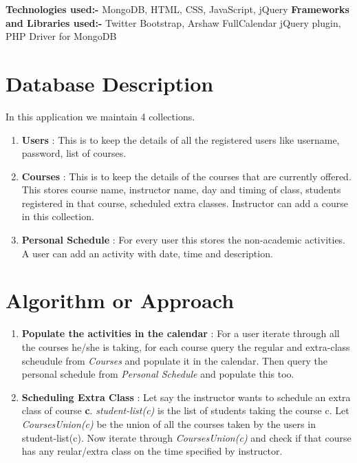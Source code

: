 \documentclass[twocolumn]{article}
\newcommand{\comment}[1]{}
\begin{document}
\textbf{Technologies used:-} MongoDB, HTML, CSS, JavaScript, jQuery
\newline
\textbf{Frameworks and Libraries used:-} Twitter Bootstrap, Arshaw FullCalendar jQuery plugin, PHP Driver for MongoDB
\comment{

Can also comment out paragraphs, etc.

}
\section{Database Description}
In this application we maintain 4 collections. 

\begin{enumerate}
  \item \textbf{Users} : This is to keep the details of all the registered users like username, password, list of courses.
  \item \textbf{Courses} : This is to keep the details of the courses that are currently offered. This stores course name, instructor name, day and timing of class, students registered in that course, scheduled extra classes. Instructor can add a course in this collection.
  \item \textbf{Personal Schedule} : For every user this stores the non-academic activities. A user can add an activity with date, time and description.

\end{enumerate}

\section{Algorithm or Approach}
\begin{enumerate}
\item \textbf{Populate the activities in the calendar} : For a user iterate through all the courses he/she is taking, for each course query the regular and extra-class scheudule from \emph{Courses} and populate it in the calendar. Then query the personal schedule from \emph{Personal Schedule} and populate this too.  
\item \textbf{Scheduling Extra Class} : Let say the instructor wants to schedule an extra class of course \textbf{c}. \emph{student-list(c)} is the list of students taking the course c. Let \emph{CoursesUnion(c)} be the union of all the courses taken by the users in student-list(c). Now iterate through \emph{CoursesUnion(c)}  and check if that course has any reular/extra class on the time specified by instructor.\\

\end{enumerate}
\end{document}
